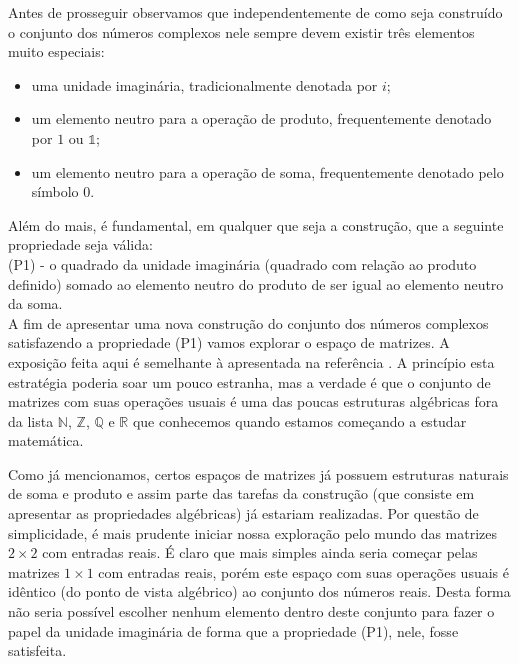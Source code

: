 \bigskip 


Antes de prosseguir observamos que independentemente de como seja construído o conjunto dos números 
complexos nele sempre devem existir três elementos muito especiais: 
\begin{itemize}
	\item uma unidade imaginária, tradicionalmente denotada por $i$;
	\item um elemento neutro para a operação de produto, frequentemente denotado por $1$ ou $\mathds{1}$; 
	\item um elemento neutro para a operação de soma, frequentemente denotado pelo símbolo $0$.
\end{itemize}
Além do mais, é fundamental, em qualquer que seja a construção, que a seguinte
propriedade seja válida:
\\[0.3cm]
(P1) - o quadrado da unidade imaginária (quadrado com relação ao produto definido) somado ao elemento neutro do produto
de ser igual ao elemento neutro da soma. 
\\[0.3cm]

A fim de apresentar uma nova construção do conjunto dos números complexos 
satisfazendo a propriedade (P1) vamos explorar o espaço de matrizes. A exposição feita aqui é semelhante
à apresentada na referência \cite{MSoa16}. 
A princípio esta estratégia poderia soar um pouco estranha, mas a verdade é que o conjunto 
de matrizes com suas operações usuais é uma das poucas estruturas algébricas fora da lista
$\mathbb{N}$, $\mathbb{Z}$, $\mathbb{Q}$ e $\mathbb{R}$ que conhecemos quando estamos começando a estudar
matemática.

Como já mencionamos, certos espaços de matrizes já possuem estruturas naturais 
de soma e produto e assim parte das tarefas
da construção (que consiste em apresentar as propriedades algébricas) já estariam realizadas.
Por questão de simplicidade, é mais prudente iniciar nossa exploração pelo mundo das matrizes $2\times 2$ com entradas reais.
É claro que mais simples ainda seria começar pelas matrizes $1\times 1$ com entradas reais, 
porém este espaço com suas operações usuais é idêntico (do ponto de vista algébrico) ao 
conjunto dos números reais. Desta forma não seria possível 
escolher nenhum elemento dentro deste conjunto para fazer o papel da unidade imaginária de 
forma que a propriedade (P1), nele, fosse satisfeita.

